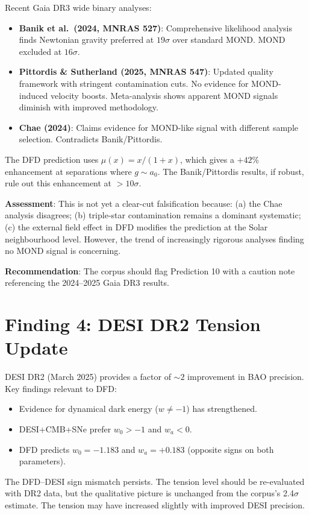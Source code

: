 \documentclass[11pt]{article}
\begin{document}
Recent Gaia DR3 wide binary analyses:
\begin{itemize}[nosep]
\item \textbf{Banik et al.\ (2024, MNRAS 527)}: Comprehensive
  likelihood analysis finds Newtonian gravity preferred at $19\sigma$
  over standard MOND. MOND excluded at $16\sigma$.
\item \textbf{Pittordis \& Sutherland (2025, MNRAS 547)}: Updated
  quality framework with stringent contamination cuts. No evidence for
  MOND-induced velocity boosts. Meta-analysis shows apparent MOND signals
  diminish with improved methodology.
\item \textbf{Chae (2024)}: Claims evidence for MOND-like signal with
  different sample selection. Contradicts Banik/Pittordis.
\end{itemize}

The DFD prediction uses $\mu(x) = x/(1+x)$, which gives a $+42\%$
enhancement at separations where $g \sim a_0$. The Banik/Pittordis
results, if robust, rule out this enhancement at $>10\sigma$.

\textbf{Assessment}: This is not yet a clear-cut falsification because:
(a) the Chae analysis disagrees; (b) triple-star contamination remains
a dominant systematic; (c) the external field effect in DFD modifies
the prediction at the Solar neighbourhood level. However, the trend of
increasingly rigorous analyses finding no MOND signal is concerning.

\textbf{Recommendation}: The corpus should flag Prediction 10 with a
caution note referencing the 2024--2025 Gaia DR3 results.


\section{Finding 4: DESI DR2 Tension Update}
\label{sec:DESI}

DESI DR2 (March 2025) provides a factor of $\sim 2$ improvement in BAO
precision. Key findings relevant to DFD:
\begin{itemize}[nosep]
\item Evidence for dynamical dark energy ($w \neq -1$) has strengthened.
\item DESI+CMB+SNe prefer $w_0 > -1$ and $w_a < 0$.
\item DFD predicts $w_0 = -1.183$ and $w_a = +0.183$ (opposite signs on
  both parameters).
\end{itemize}

The DFD--DESI sign mismatch persists. The tension level should be
re-evaluated with DR2 data, but the qualitative picture is unchanged
from the corpus's 2.4$\sigma$ estimate. The tension may have increased
slightly with improved DESI precision.
\end{document}
